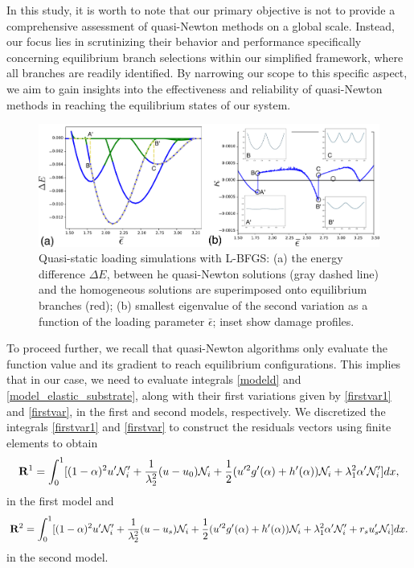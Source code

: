 In  this study, it is worth to note that our primary objective is not to provide a comprehensive assessment of quasi-Newton methods on a global scale. Instead, our focus lies in scrutinizing their behavior and performance specifically concerning equilibrium branch selections within our simplified framework, where all branches are readily identified. By narrowing our scope to this specific aspect, we aim to gain insights into the effectiveness and reliability of quasi-Newton methods in reaching the equilibrium states of our system.
\begin{figure}
\includegraphics[scale=0.13]{./final_images/fig4.pdf}
    \caption{
Quasi-static loading simulations with L-BFGS: (a) the energy difference $\Delta E$, between he quasi-Newton solutions (gray dashed line) and the homogeneous solutions are superimposed onto equilibrium branches (red); (b) smallest eigenvalue of the second variation  as a function of the loading parameter $\bar\epsilon$; inset show damage profiles.}
    \label{fig:tempo1}
\end{figure}

To proceed further, we recall that quasi-Newton algorithms only evaluate the function value and its gradient to reach equilibrium configurations. This implies that in our case, we need to evaluate integrals \eqref{modeld} and \eqref{model_elastic_substrate}, along with their first variations given by \eqref{firstvar1} and \eqref{firstvar}, in the first and second models, respectively. We   discretized the integrals \eqref{firstvar1} and \eqref{firstvar} to construct the residuals vectors using finite elements to obtain 
\begin{equation}
{\bf R}^1=\int_0^1 [(1-\alpha)^2u'\mathcal{N}'_i+\frac{1}{\lambda_2^2} (u-u_0) \mathcal{N}_i+\frac{1}{2}(u'^2 g'(\alpha)+h'(\alpha))\mathcal{N}_i+\lambda_1^2\alpha'\mathcal{N}'_i ]dx,\label{residual1}
\end{equation}
in the first model and 
\begin{equation}
{\bf R}^2=\int_0^1 [(1-\alpha)^2u'\mathcal{N}'_i+\frac{1}{\lambda_2^2} (u-u_s) \mathcal{N}_i+\frac{1}{2}(u'^2 g'(\alpha)+h'(\alpha))\mathcal{N}_i+\lambda_1^2\alpha'\mathcal{N}'_i +r_su_s'\mathcal{N}_i]dx\label{residual2}.
\end{equation}
in the second model. 

